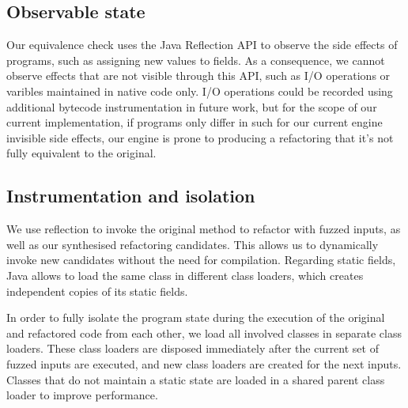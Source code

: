 \documentclass[sigconf,review,anonymous]{acmart}
\begin{document}

\subsection{Observable state}\label{sec:observable}

Our equivalence check uses the Java Reflection API to observe the side effects
of programs, such as assigning new values to fields. As a consequence, we cannot
observe effects that are not visible through this API, such as I/O operations or
varibles maintained in native code only. I/O operations could be recorded using
additional bytecode instrumentation in future work, but for the scope of our current
implementation, if programs only differ in such for our current engine invisible
side effects, our engine is prone to producing a refactoring that it's not fully equivalent to the original.



  
\subsection{Instrumentation and isolation}

We use reflection to invoke the original method to refactor with fuzzed inputs,
as well as our synthesised refactoring candidates. This allows us to dynamically
invoke new candidates without the need for compilation.
Regarding static fields, Java
allows to load the same class in different class loaders, which creates
independent copies of its static fields.

In order to fully isolate the program state during the execution of the original and refactored code from each other, we load all involved classes in separate
class loaders. These class loaders are disposed immediately after the current set
of fuzzed inputs are executed, and new class loaders are created for the next
inputs. %
Classes that do not maintain a static state are loaded in a shared
parent class loader to improve performance.
\end{document}
